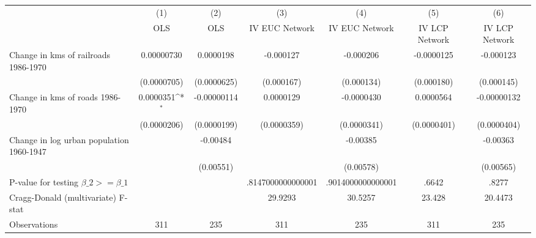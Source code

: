 {
\def\sym#1{\ifmmode^{#1}\else\(^{#1}\)\fi}
\begin{tabular}{l*{6}{c}}
\hline\hline
                &\multicolumn{1}{c}{(1)}&\multicolumn{1}{c}{(2)}&\multicolumn{1}{c}{(3)}&\multicolumn{1}{c}{(4)}&\multicolumn{1}{c}{(5)}&\multicolumn{1}{c}{(6)}\\
                &\multicolumn{1}{c}{OLS}&\multicolumn{1}{c}{OLS}&\multicolumn{1}{c}{IV EUC Network}&\multicolumn{1}{c}{IV EUC Network}&\multicolumn{1}{c}{IV LCP Network}&\multicolumn{1}{c}{IV LCP Network}\\
\hline
Change in kms of railroads 1986-1970&0.00000730         &0.0000198         &-0.000127         &-0.000206         &-0.0000125         &-0.000123         \\
                &(0.0000705)         &(0.0000625)         &(0.000167)         &(0.000134)         &(0.000180)         &(0.000145)         \\
[1em]
Change in kms of roads 1986-1970&0.0000351\sym{*}  &-0.00000114         &0.0000129         &-0.0000430         &0.0000564         &-0.00000132         \\
                &(0.0000206)         &(0.0000199)         &(0.0000359)         &(0.0000341)         &(0.0000401)         &(0.0000404)         \\
[1em]
Change in log urban population 1960-1947&                  & -0.00484         &                  & -0.00385         &                  & -0.00363         \\
                &                  &(0.00551)         &                  &(0.00578)         &                  &(0.00565)         \\
\hline
P-value for testing $\beta\_{2} >= \beta\_{1}$&                  &                  &.8147000000000001         &.9014000000000001         &    .6642         &    .8277         \\
Cragg-Donald (multivariate) F-stat&                  &                  &  29.9293         &  30.5257         &   23.428         &  20.4473         \\
Observations    &      311         &      235         &      311         &      235         &      311         &      235         \\
\hline\hline
\end{tabular}
}
